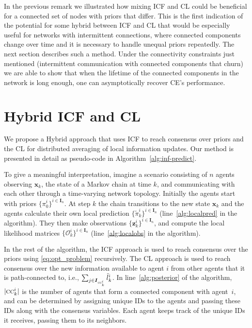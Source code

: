\documentclass[journal]{IEEEtran}
\newcommand{\vect}[1]{{\mathbf{#1}}}
\theoremstyle{remark}
\newcommand{\bIn}{\boldsymbol{I}_{{n}}}
\newcommand{\bIs}[1]{\boldsymbol{I}_{#1}}  %
\newcommand{\suf}[1]{\textsc{\tiny #1}}  %
\theoremstyle{definition}
\begin{document}
In the previous remark we illustrated how mixing ICF and CL could be beneficial
for a connected set of nodes with priors that differ.  This is the first
indication of the potential for some hybrid between ICF and CL that would be
especially useful for networks with intermittent connections, where connected
components change over time and it is necessary to handle
unequal priors repeatedly.  The next section describes such a method.  Under the
connectivity constraints just mentioned (intermittent communication with
connected components that churn) we are able to show that when the lifetime of
the connected components in the network is long enough, one can asymptotically
recover CE's performance.

\section{Hybrid ICF and CL} 
\label{subsec:Method}

We propose a Hybrid approach that uses ICF to reach consensus over priors and 
the CL
for distributed averaging of local information updates. Our method is
presented in detail as pseudo-code in Algorithm~\ref{alg:inf-predict}. 

To give a meaningful interpretation, imagine a 
scenario consisting of $n$ agents observing $\vect{x}_k$, the state of a 
Markov chain at time $k$, and communicating with each other through a 
time-varying network topology. Initially the agents start with  priors 
$\{{\pi}_0^i\}^{i \in \bIn} $. At step $k$ the chain transitions to the new 
state $\vect{x}_k$ and the agents calculate their own local prediction 
$\{\tilde{{\pi}}_k^i\}^{i \in \bIn} $ (line~\ref{alg:localpred} in the algorithm). 
They then make 
observations $\{\vect{z}_k^i\}^{i \in \bIn}$, and compute the local likelihood  
matrices $\{\mathcal{O}_k^i\}^{i \in \bIn}$ (line~\ref{alg:localobs} in the algorithm).

In the rest of the algorithm, the ICF approach is used to reach 
consensus over the priors using \eqref{eq:opt_problem} recursively. The CL 
approach is used to reach consensus over the new information available to 
agent $i$ from other agents that it is path-connected to, i.e., 
$\textstyle \sum_{{j \in \bIs{\suf{cc}^i_k} }}  \tilde{l}_k^i$. In line~\ref{alg:posterior} of the algorithm, $|\textsc{cc}^i_k|$ is the number of agents that form a 
connected 
component with agent~$i$, and can be determined by assigning unique IDs to the 
agents and 
passing these IDs along with the consensus variables. Each agent keeps track of 
the unique IDs it receives, passing them to its neighbors.
\end{document}
